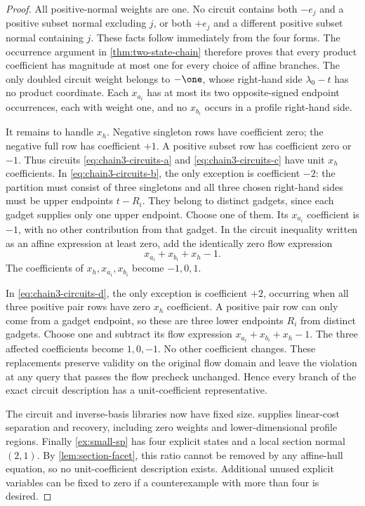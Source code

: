 \begin{proof}
All positive-normal weights are one. No circuit contains both
$-e_j$ and a positive subset normal excluding $j$, or both
$+e_j$ and a different positive subset normal containing $j$.
These facts follow immediately from the four forms. The occurrence
argument in \cref{thm:two-state-chain} therefore proves that every
product coefficient has magnitude at most one for every choice of
affine branches. The only doubled circuit weight belongs to
$-\one$, whose right-hand side $\lambda_0-t$ has no product
coordinate. Each $x_{a_i}$ has at most its two opposite-signed
endpoint occurrences, each with weight one, and no $x_{b_i}$
occurs in a profile right-hand side.

It remains to handle $x_h$. Negative singleton rows have coefficient
zero; the negative full row has coefficient $+1$. A positive
subset row has coefficient zero or $-1$. Thus circuits
\eqref{eq:chain3-circuits-a} and \eqref{eq:chain3-circuits-c}
have unit $x_h$ coefficients. In
\eqref{eq:chain3-circuits-b}, the only exception is coefficient
$-2$: the partition must consist of three singletons and all three
chosen right-hand sides must be upper endpoints $t-R_i$.
They belong to distinct gadgets, since each gadget supplies only
one upper endpoint. Choose one of them. Its $x_{a_i}$ coefficient
is $-1$, with no other contribution from that gadget. In the
circuit inequality written as an affine expression at least zero,
add the identically zero flow expression
\[
 x_{a_i}+x_{b_i}+x_h-1.
\]
The coefficients of $x_h,x_{a_i},x_{b_i}$ become $-1,0,1$.

In \eqref{eq:chain3-circuits-d}, the only exception is coefficient
$+2$, occurring when all three positive pair rows have zero
$x_h$ coefficient. A positive pair row can only come from a
gadget endpoint, so these are three lower endpoints $R_i$ from
distinct gadgets. Choose one and subtract its flow expression
$x_{a_i}+x_{b_i}+x_h-1$. The three affected coefficients become
$1,0,-1$. No other coefficient changes. These replacements preserve
validity on the original flow domain and leave the violation at any
query that passes the flow precheck unchanged. Hence every branch
of the exact circuit description has a unit-coefficient representative.

The circuit and inverse-basis libraries now have fixed size.
 supplies linear-cost separation and recovery,
including zero weights and lower-dimensional profile regions.
Finally \cref{ex:small-sp} has four explicit states and a local
section normal $(2,1)$. By \cref{lem:section-facet}, this ratio
cannot be removed by any affine-hull equation, so no unit-coefficient
description exists. Additional unused explicit variables can be
fixed to zero if a counterexample with more than four is desired.
\end{proof}

